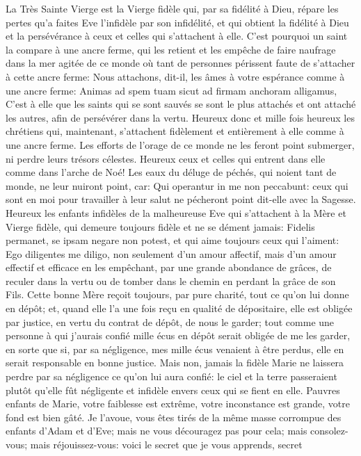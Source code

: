  La Très Sainte Vierge est la Vierge fidèle qui, par sa fidélité à Dieu, répare les pertes qu'a faites Eve l'infidèle
par son infidélité, et qui obtient la fidélité à Dieu et la persévérance à ceux et celles qui s'attachent à elle. C'est
pourquoi un saint la compare à une ancre ferme, qui les retient et les empêche de faire naufrage dans la mer
agitée de ce monde où tant de personnes périssent faute de s'attacher à cette ancre ferme: Nous attachons, dit-il,
les âmes à votre espérance comme à une ancre ferme: Animas ad spem tuam sicut ad firmam anchoram
alligamus, C'est à elle que les saints qui se sont sauvés se sont le plus attachés et ont attaché les autres, afin de
persévérer dans la vertu. Heureux donc et mille fois heureux les chrétiens qui, maintenant, s'attachent fidèlement
et entièrement à elle comme à une ancre ferme. Les efforts de l'orage de ce monde ne les feront point submerger,
ni perdre leurs trésors célestes. Heureux ceux et celles qui entrent dans elle comme dans l'arche de Noé! Les
eaux du déluge de péchés, qui noient tant de monde, ne leur nuiront point, car: Qui operantur in me non
peccabunt: ceux qui sont en moi pour travailler à leur salut ne pécheront point dit-elle avec la Sagesse. Heureux
les enfants infidèles de la malheureuse Eve qui s'attachent à la Mère et Vierge fidèle, qui demeure toujours fidèle
et ne se dément jamais: Fidelis permanet, se ipsam negare non potest, et qui aime toujours ceux qui l'aiment: Ego
diligentes me diligo, non seulement d'un amour affectif, mais d'un amour effectif et efficace en les empêchant, par
une grande abondance de grâces, de reculer dans la vertu ou de tomber dans le chemin en perdant la grâce de
son Fils.
 Cette bonne Mère reçoit toujours, par pure charité, tout ce qu'on lui donne en dépôt; et, quand elle l'a une
fois reçu en qualité de dépositaire, elle est obligée par justice, en vertu du contrat de dépôt, de nous le garder; tout
comme une personne à qui j'aurais confié mille écus en dépôt serait obligée de me les garder, en sorte que si, par
sa négligence, mes mille écus venaient à être perdus, elle en serait responsable en bonne justice. Mais non,
jamais la fidèle Marie ne laissera perdre par sa négligence ce qu'on lui aura confié: le ciel et la terre passeraient
plutôt qu'elle fût négligente et infidèle envers ceux qui se fient en elle.
 Pauvres enfants de Marie, votre faiblesse est extrême, votre inconstance est grande, votre fond est bien
gâté. Je l'avoue, vous êtes tirés de la même masse corrompue des enfants d'Adam et d'Eve; mais ne vous
découragez pas pour cela; mais consolez-vous; mais réjouissez-vous: voici le secret que je vous apprends, secret
